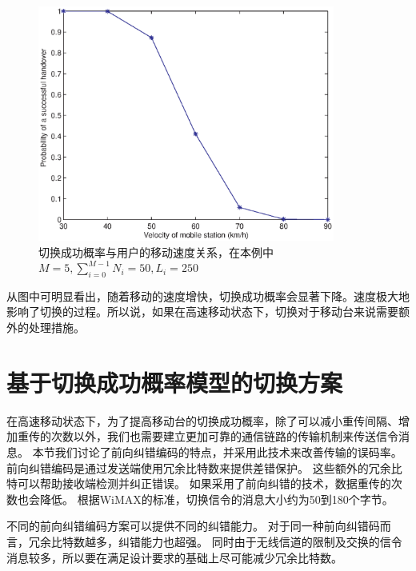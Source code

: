 \begin{figure}[t]
\begin{centering}
\includegraphics[height=7.75cm]{iccs_speed_prob_theroy}
\caption{切换成功概率与用户的移动速度关系，在本例中~$M=5, \sum_{i=0}^{M-1}N_i=50, L_i=250$~}
\label{fig:chap_iccs_handover_algorithm_Pro_V}
\end{centering}
\end{figure}

从图中可明显看出，随着移动的速度增快，切换成功概率会显著下降。速度极大地影响了切换的过程。所以说，如果在高速移动状态下，切换对于移动台来说需要额外的处理措施。

\section{基于切换成功概率模型的切换方案}
在高速移动状态下，为了提高移动台的切换成功概率，除了可以减小重传间隔、增加重传的次数以外，我们也需要建立更加可靠的通信链路的传输机制来传送信令消息。
本节我们讨论了前向纠错编码的特点，并采用此技术来改善传输的误码率。
前向纠错编码是通过发送端使用冗余比特数来提供差错保护。
这些额外的冗余比特可以帮助接收端检测并纠正错误。
如果采用了前向纠错的技术，数据重传的次数也会降低。
根据WiMAX的标准，切换信令的消息大小约为50到180个字节。

不同的前向纠错编码方案可以提供不同的纠错能力。
对于同一种前向纠错码而言，冗余比特数越多，纠错能力也超强。
同时由于无线信道的限制及交换的信令消息较多，所以要在满足设计要求的基础上尽可能减少冗余比特数。

